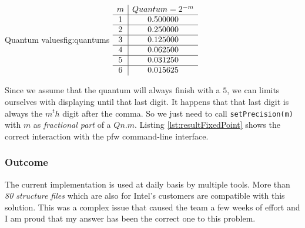 \begin{figureGraphics}{Quantum values}{fig:quantums}
    $
    \begin{array}{c|c}
        m & Quantum = 2^{-m} \\
        \hline
        1 & 0.500000 \\
        \hline
        2 & 0.250000 \\
        \hline
        3 & 0.125000 \\
        \hline
        4 & 0.062500 \\
        \hline
        5 & 0.031250 \\
        \hline
        6 & 0.015625
    \end{array}
    \vspace{0.3cm}
    $
\end{figureGraphics}

Since we assume that the quantum will always finish with a $5$, we can limits ourselves with displaying until that last digit.
It happens that that last digit is always the $m^th$ digit after the comma.
So we just need to call \lstinline{setPrecision(m)} with $m$ as \emph{fractional part} of a $Qn.m$.
Listing \ref{lst:resultFixedPoint} shows the correct interaction with the \gls{pfw} command-line interface.


\subsubsection{Outcome}

The current implementation is used at daily basis by multiple tools.
More than \emph{80 structure files} which are also for Intel's customers are compatible with this solution.
This was a complex issue that caused the team a few weeks of effort and I am proud that my answer has been the
correct one to this problem.


